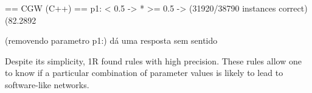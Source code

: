 == CGW (C++) ==
p1:
        < 0.5   -> *
        >= 0.5  ->
        (31920/38790 instances correct) (82.2892%

(removendo parametro p1:)
dá uma resposta sem sentido



Despite its simplicity, 1R found rules with high precision. These rules allow
one to know if a particular combination of parameter values is likely to lead to
software-like networks.

%


%
%

%
%
%
%
%
%
%

